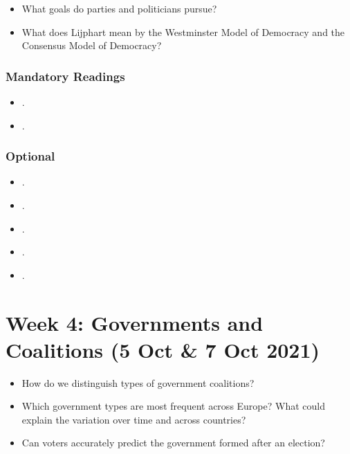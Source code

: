 \documentclass[abstract=on,parskip=full,headings=standardclasses,fontsize=11pt,paper=a4]{scrartcl}
\begin{document}
\begin{itemize}
\renewcommand\labelitemi{--}
\item What goals do parties and politicians pursue?
\item What does Lijphart mean by the Westminster Model of Democracy and the Consensus Model of Democracy?
\end{itemize}

\subsubsection*{Mandatory Readings}
\begin{itemize}
\item {}.
\item {}.
\end{itemize}


\subsubsection*{Optional}
\begin{itemize}
\item {}.
\item {}.
\item {}.
\item {}.
\item {}.
\end{itemize}





\section{Week 4: Governments and Coalitions (5 Oct \& 7 Oct 2021)}





\begin{itemize}
\renewcommand\labelitemi{--}
\item How do we distinguish types of government coalitions?
\item Which government types are most frequent across Europe?  What could explain the variation over time and across countries?
\item Can voters accurately predict the government formed after an election?
\end{itemize}
\end{document}
